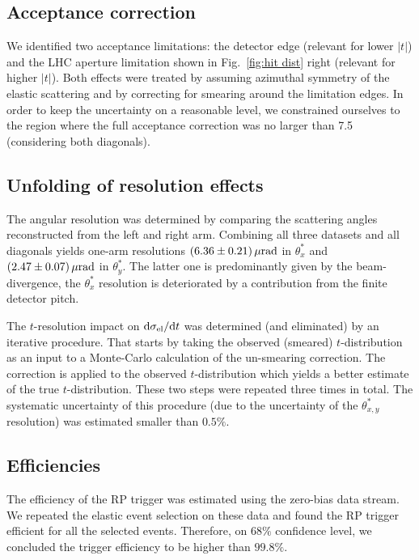\documentclass[doublecol]{../macros/epl2}
\def\d{{\rm d}}
\def\un#1{\,{\rm #1}}
\begin{document}
\subsection{Acceptance correction}

We identified two acceptance limitations: the detector edge (relevant for lower $|t|$) and the LHC aperture limitation shown in Fig.~\ref{fig:hit dist} right (relevant for higher $|t|$). Both effects were treated by assuming azimuthal symmetry of the elastic scattering and by correcting for smearing around the limitation edges. In order to keep the uncertainty on a reasonable level, we constrained ourselves to the region where the full acceptance correction was no larger than 7.5 (considering both diagonals).


\subsection{Unfolding of resolution effects}

The angular resolution was determined by comparing the scattering angles reconstructed from the left and right arm. Combining all three datasets and all diagonals yields one-arm resolutions $(6.36\pm 0.21)\un{\mu rad}$ in $\theta^*_x$ and $(2.47\pm 0.07)\un{\mu rad}$ in $\theta^*_y$. The latter one is predominantly given by the beam-divergence, the $\theta^*_x$ resolution is deteriorated by a contribution from the finite detector pitch.

The $t$-resolution impact on $\d\sigma_{\rm el}/\d t$  was determined (and eliminated) by an iterative procedure. That starts by taking the observed (smeared) $t$-distribution as an input to a Monte-Carlo calculation of the un-smearing correction. The correction is applied to the observed $t$-distribution which yields a better estimate of the true $t$-distribution. These two steps were repeated three times in total. The systematic uncertainty of this procedure (due to the uncertainty of the $\theta^*_{x, y}$ resolution) was estimated smaller than $0.5\%$.

\subsection{Efficiencies}

The efficiency of the RP trigger was estimated using the zero-bias data stream. We repeated the elastic event selection on these data and found the RP trigger efficient for all the selected events. Therefore, on $68\%$ confidence level, we concluded the trigger efficiency to be higher than $99.8\%$.
\end{document}

